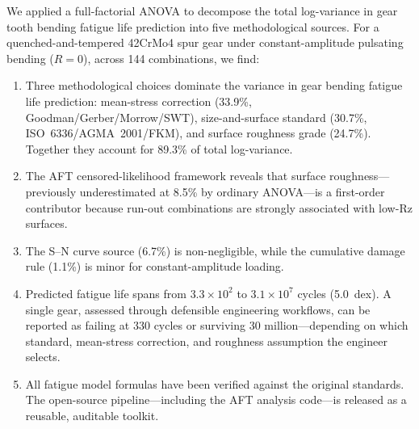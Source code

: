 \documentclass[12pt,a4paper]{article}
\begin{document}
We applied a full-factorial ANOVA to decompose the total log-variance in
gear tooth bending fatigue life prediction into five methodological
sources. For a quenched-and-tempered 42CrMo4 spur gear under
constant-amplitude pulsating bending ($R=0$), across 144 combinations,
we find:

\begin{enumerate}
  \item Three methodological choices dominate the variance in gear
        bending fatigue life prediction: mean-stress correction (33.9\%,
        Goodman/Gerber/Morrow/SWT), size-and-surface standard (30.7\%,
        ISO~6336/AGMA~2001/FKM), and surface roughness grade (24.7\%).
        Together they account for 89.3\% of total log-variance.
  \item The AFT censored-likelihood framework reveals that surface
        roughness---previously underestimated at 8.5\% by ordinary
        ANOVA---is a first-order contributor because run-out
        combinations are strongly associated with low-Rz surfaces.
  \item The S--N curve source (6.7\%) is non-negligible, while the
        cumulative damage rule (1.1\%) is minor for constant-amplitude
        loading.
  \item Predicted fatigue life spans from $3.3\times10^2$ to
        $3.1\times10^7$ cycles (5.0~dex). A single gear, assessed
        through defensible engineering workflows, can be reported as
        failing at 330 cycles or surviving 30 million---depending on
        which standard, mean-stress correction, and roughness
        assumption the engineer selects.
  \item All fatigue model formulas have been verified against the
        original standards. The open-source pipeline---including
        the AFT analysis code---is released as a reusable, auditable
        toolkit.
\end{enumerate}
\end{document}
